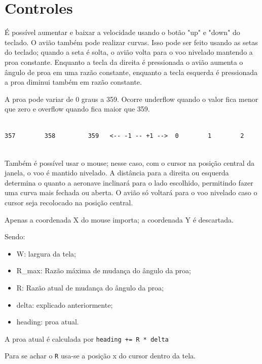 
\chapter{Controles}
É possível aumentar e baixar a velocidade usando o botão "up" e "down" do teclado. O avião também pode realizar curvas. 
Isso pode ser feito usando as setas do teclado; quando a seta é solta, o avião volta para o voo nivelado mantendo a proa constante. Enquanto a tecla da direita é pressionada o avião aumenta o ângulo de proa em uma razão constante, enquanto a tecla esquerda é pressionada a proa diminui também em razão constante.

A proa pode variar de 0 graus a 359. Ocorre underflow quando o valor fica menor que zero e overflow quando fica maior que 359.

\begin{verbatim}
    
357        358         359   <-- -1 -- +1 -->  0        1        2
                        
\end{verbatim}

Também é possível usar o mouse; nesse caso, com o cursor na posição central da janela, o voo é mantido nivelado. A distância para a direita ou esquerda determina o quanto a aeronave inclinará para o lado escolhido, permitindo fazer uma curva mais fechada ou aberta. O avião só voltará para o voo nivelado caso o cursor seja recolocado na posição central.

Apenas a coordenada X do mouse importa; a coordenada Y é descartada.

Sendo:

\begin{itemize}
\item W: largura da tela;
\item R\_max: Razão máxima de mudança do ângulo da proa;
\item R: Razão atual de mudança do ângulo da proa;
\item delta: explicado anteriormente;
\item heading: proa atual.
\end{itemize}


A proa atual é calculada por
\texttt{heading += R * delta}

Para se achar o \texttt{R} usa-se a posição x do cursor dentro da tela.

